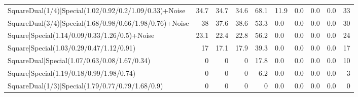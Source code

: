 \begin{tabular}{lrrrrllllr}
 SquareDual(1/4)|Special(1.02/0.92/0.2/1.09/0.33)+Noise  &         34.7 &         34.7 &         34.6 &            68.1 & 11.9           & 0.0            & 0.0            & 0.0             &           33 \\
 SquareDual(3/4)|Special(1.68/0.98/0.66/1.98/0.76)+Noise &         38   &         37.6 &         38.6 &            53.3 & 0.0            & 0.0            & 0.0            & 0.0             &           30 \\
 Square|Special(1.14/0.09/0.33/1.26/0.5)+Noise           &         23.1 &         22.4 &         22.8 &            56.2 & 0.0            & 0.0            & 0.0            & 0.0             &           24 \\
 Square|Special(1.03/0.29/0.47/1.12/0.91)                &         17   &         17.1 &         17.9 &            39.3 & 0.0            & 0.0            & 0.0            & 0.0             &           17 \\
 SquareDual|Special(1.07/0.63/0.08/1.67/0.34)            &          0   &          0   &          0   &            17.8 & 0.0            & 0.0            & 0.0            & 0.0             &           10 \\
 Square|Special(1.19/0.18/0.99/1.98/0.74)                &          0   &          0   &          0   &             6.2 & 0.0            & 0.0            & 0.0            & 0.0             &            3 \\
 SquareDual(1/3)|Special(1.79/0.77/0.79/1.68/0.9)        &          0   &          0   &          0   &             0   & 0.0            & 0.0            & 0.0            & 0.0             &            0 \\
\hline
\end{tabular}